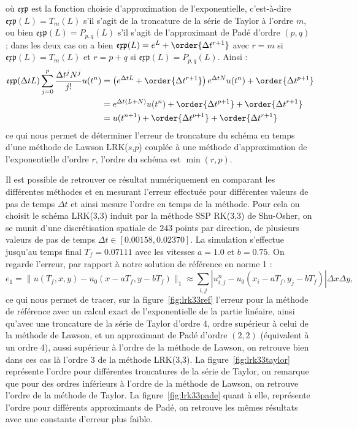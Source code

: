 où $\mathfrak{exp}$ est la fonction choisie d'approximation de l'exponentielle, c'est-à-dire $\mathfrak{exp}(L) = T_m(L)$ s'il s'agit de la troncature de la série de Taylor à l'ordre $m$, ou bien $\mathfrak{exp}(L) = P_{p,q}(L)$ s'il s'agit de l'approximant de Padé d'ordre $(p,q)$ ; dans les deux cas on a bien $\mathfrak{exp}(L) = e^{L} + \order{\Delta t^{r+1}}$ avec $r = m$ si $\mathfrak{exp}(L) = T_m(L)$ et $r = p+q$ si $\mathfrak{exp}(L) = P_{p,q}(L)$. Ainsi :
$$
  \begin{aligned}
    \mathfrak{exp}(\Delta tL)\sum_{j=0}^{p}\frac{\Delta t^jN^j}{j!}u(t^n) &= \left(e^{\Delta t L} + \order{\Delta t^{r+1}}\right)e^{\Delta t N}u(t^n) + \order{\Delta t^{p+1}} \\
      &= e^{\Delta t(L+N)}u(t^n) + \order{\Delta t^{p+1}} + \order{\Delta t^{r+1}} \\
      &= u(t^{n+1}) + \order{\Delta t^{p+1}} + \order{\Delta t^{r+1}}
  \end{aligned}
$$
ce qui nous permet de déterminer l'erreur de troncature du schéma en temps d'une méthode de Lawson LRK($s$,$p$) couplée à une méthode d'approximation de l'exponentielle d'ordre $r$, l'ordre du schéma est $\min(r,p)$.

Il est possible de retrouver ce résultat numériquement en comparant les différentes méthodes et en mesurant l'erreur effectuée pour différentes valeurs de pas de temps $\Delta t$ et ainsi mesure l'ordre en temps de la méthode. Pour cela on choisit le schéma LRK(3,3) induit par la méthode SSP RK(3,3) de Shu-Osher, on se munit d'une discrétisation spatiale de $243$ points par direction, de plusieurs valeurs de pas de temps $\Delta t\in[0.00158,0.02370]$. La simulation s'effectue jusqu'au temps final $T_f=0.07111$ avec les vitesses $a=1.0$ et $b=0.75$. On regarde l'erreur, par rapport à notre solution de référence en norme 1 :
$$
  e_1 = \| u(T_f,x,y) - u_0(x-aT_f,y-bT_f) \|_1 \approx \sum_{i,j}|u^n_{i,j}-u_0(x_i-aT_f,y_j-bT_f)|\Delta x\Delta y,
$$
ce qui nous permet de tracer, sur la figure~\ref{fig:lrk33ref} l'erreur pour la méthode de référence avec un calcul exact de l'exponentielle de la partie linéaire, ainsi qu'avec une troncature de la série de Taylor d'ordre 4, ordre supérieur à celui de la méthode de Lawson, et un approximant de Padé d'ordre $(2,2)$ (équivalent à un ordre 4), aussi supérieur à l'ordre de la méthode de Lawson, on retrouve bien dans ces cas là l'ordre 3 de la méthode LRK(3,3). La figure~\ref{fig:lrk33taylor} représente l'ordre pour différentes troncatures de la série de Taylor, on remarque que pour des ordres inférieurs à l'ordre de la méthode de Lawson, on retrouve l'ordre de la méthode de Taylor. La figure~\ref{fig:lrk33pade} quant à elle, représente l'ordre pour différents approximants de Padé, on retrouve les mêmes résultats avec une constante d'erreur plus faible.


